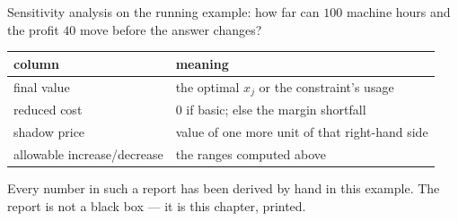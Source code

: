 \begin{worked}{Sensitivity analysis on the running example: how far can $100$ machine hours and the profit $40$ move before the answer changes?}
\begin{center}\footnotesize
\begin{tabular}{ll}
  \hline
  column & meaning\\
  \hline
  final value & the optimal $x_{j}$ or the constraint's usage\\
  reduced cost & $0$ if basic; else the margin shortfall\\
  shadow price & value of one more unit of that right-hand side\\
  allowable increase/decrease & the ranges computed above\\
  \hline
\end{tabular}
\end{center}
Every number in such a report has been derived by hand in this example. The
report is not a black box --- it is this chapter, printed.
\end{worked}

